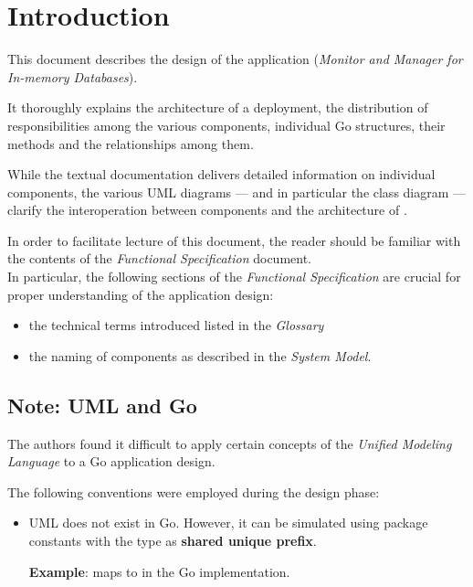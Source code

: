 \section{Introduction}

This document describes the design of the application \mamid (\emph{Monitor and Manager for In-memory Databases}).

It thoroughly explains the architecture of a \mamid deployment, the distribution of responsibilities among the various components,
individual Go structures, their methods and the relationships among them.

While the textual documentation delivers detailed information on individual components, the various UML diagrams
--- and in particular the class diagram --- clarify the interoperation between components and the architecture of \mamid.

In order to facilitate lecture of this document, the reader should be familiar with the contents of the \emph{Functional Specification}
document.\\
In particular, the following sections of the \emph{Functional Specification} are crucial for proper understanding of the
application design:
\begin{itemize}
  \item the technical terms introduced listed in the \emph{Glossary}
  \item the naming of \mamid components as described in the \emph{System Model}.
\end{itemize}

\subsection{Note: UML and Go}

The authors found it difficult to apply certain concepts of the \emph{Unified Modeling Language} to a Go application design.

The following conventions were employed during the design phase:

\begin{itemize}
        \item UML  does not exist in Go. However, it can be simulated using package constants with the  type as \textbf{shared unique prefix}. 

                \textbf{Example}:  maps to  in the Go implementation.
\end{itemize}

